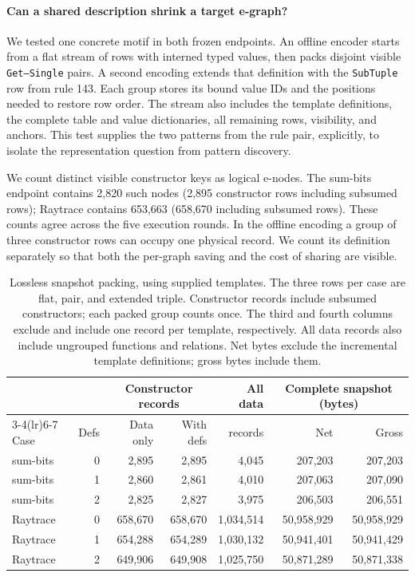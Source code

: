 \documentclass[10pt,letterpaper]{article}
\begin{document}
\paragraph{Can a shared description shrink a target e-graph?}
We tested one concrete motif in both frozen endpoints. An offline encoder starts from a flat stream of rows with interned typed values, then packs disjoint visible \texttt{Get--Single} pairs. A second encoding extends that definition with the \texttt{SubTuple} row from rule 143. Each group stores its bound value IDs and the positions needed to restore row order. The stream also includes the template definitions, the complete table and value dictionaries, all remaining rows, visibility, and anchors. This test supplies the two patterns from the rule pair, explicitly, to isolate the representation question from pattern discovery.

We count distinct visible constructor keys as logical e-nodes. The sum-bits endpoint contains 2,820 such nodes (2,895 constructor rows including subsumed rows); Raytrace contains 653,663 (658,670 including subsumed rows). These counts agree across the five execution rounds. In the offline encoding a group of three constructor rows can occupy one physical record. We count its definition separately so that both the per-graph saving and the cost of sharing are visible.

\begin{table}[ht]
\centering\small
\caption{Lossless snapshot packing, using supplied templates. The three rows per case are flat, pair, and extended triple. Constructor records include subsumed constructors; each packed group counts once. The third and fourth columns exclude and include one record per template, respectively. All data records also include ungrouped functions and relations. Net bytes exclude the incremental template definitions; gross bytes include them.}
\label{tab:packed-nodes}
\begin{tabular}{lrrrrrr}
\toprule
& & \multicolumn{2}{c}{Constructor records} & All data & \multicolumn{2}{c}{Complete snapshot (bytes)}\\
\cmidrule(lr){3-4}\cmidrule(lr){6-7}
Case & Defs & Data only & With defs & records & Net & Gross\\
\midrule
sum-bits & 0 & 2,895 & 2,895 & 4,045 & 207,203 & 207,203 \\
sum-bits & 1 & 2,860 & 2,861 & 4,010 & 207,063 & 207,090 \\
sum-bits & 2 & 2,825 & 2,827 & 3,975 & 206,503 & 206,551 \\
\midrule
Raytrace & 0 & 658,670 & 658,670 & 1,034,514 & 50,958,929 & 50,958,929 \\
Raytrace & 1 & 654,288 & 654,289 & 1,030,132 & 50,941,401 & 50,941,429 \\
Raytrace & 2 & 649,906 & 649,908 & 1,025,750 & 50,871,289 & 50,871,338 \\
\bottomrule
\end{tabular}
\end{table}
\end{document}
